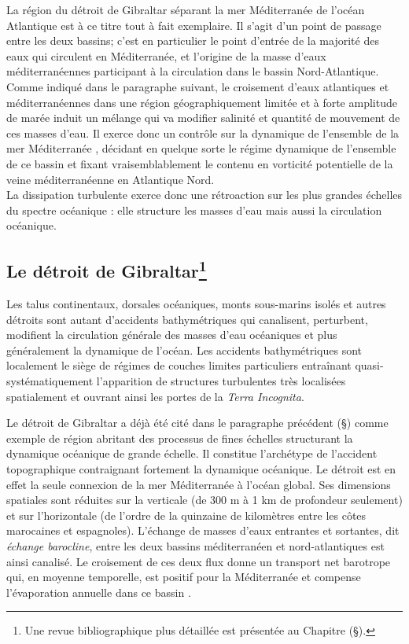 La région du détroit de Gibraltar séparant la mer Méditerranée de l'océan Atlantique est à ce titre tout à fait exemplaire. Il s'agit d'un point de passage entre les deux bassins; c'est en particulier le point d'entrée de la majorité des eaux qui circulent en Méditerranée, et l'origine de la masse d'eaux méditerranéennes participant à la circulation dans le bassin Nord-Atlantique. Comme indiqué dans le paragraphe suivant, le croisement d'eaux atlantiques et méditerranéennes dans une région géographiquement limitée et à forte amplitude de marée induit un mélange qui va modifier salinité et quantité de mouvement de ces masses d'eau. Il exerce donc un contrôle sur la dynamique de l'ensemble de la mer Méditerranée \citep{FA1988}, décidant en quelque sorte le régime dynamique de l'ensemble de ce bassin et fixant vraisemblablement le contenu en vorticité potentielle de la veine méditerranéenne en Atlantique Nord.\\


La dissipation turbulente exerce donc une rétroaction sur les plus grandes échelles du spectre océanique : elle  structure les masses d'eau mais aussi la circulation océanique.

\subsection[Le détroit de Gibraltar]{Le détroit de Gibraltar\protect\footnote{\color{red}Une revue bibliographique plus détaillée est présentée au Chapitre  (\S {}).}}

Les talus continentaux, dorsales océaniques, monts sous-marins isolés et autres détroits sont autant d'accidents bathymétriques qui canalisent, perturbent, modifient la circulation générale des masses d'eau océaniques et plus généralement la dynamique de l'océan. Les accidents bathymétriques sont localement le siège de régimes de couches limites particuliers entraînant quasi-systématiquement l'apparition de structures turbulentes très localisées spatialement et ouvrant ainsi les portes de la \textit{Terra Incognita}.

Le détroit de Gibraltar a déjà été cité dans le paragraphe précédent (\S {}) comme exemple de région abritant des processus de fines échelles structurant la dynamique océanique de grande échelle. Il constitue l'archétype de l'accident topographique contraignant fortement la dynamique océanique. Le détroit est en effet la seule connexion de la mer Méditerranée à l'océan global. Ses dimensions spatiales sont réduites sur la verticale (de 300 m à 1 km de profondeur seulement) et sur l'horizontale (de l'ordre de la quinzaine de kilomètres entre les côtes marocaines et espagnoles). L'échange de masses d'eaux entrantes et sortantes, dit \textit{échange barocline}, entre les deux bassins méditerranéen et nord-atlantiques est ainsi canalisé. Le croisement de ces deux flux donne un transport net barotrope qui, en moyenne temporelle, est positif pour la Méditerranée et compense l'évaporation annuelle dans ce bassin \citep{Bryden94}.

